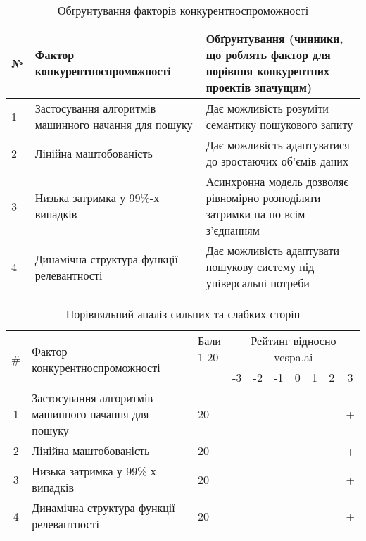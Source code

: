 \begin{table}
	\begin{tabular}
		{|l|p{7cm}|p{7cm}|} \hline
		№ & Фактор конкурентноспроможності & Обґрунтування (чинники, що роблять фактор для порівння конкурентних проектів значущим) \\ \hline
		1 & Застосування алгоритмів машинного начання для пошуку & Дає можливість розуміти семантику пошукового запиту \\ \hline
		2 & Лінійна маштобованість & Дає можливість адаптуватися до зростаючих об'ємів даних \\ \hline
		3 & Низька затримка у 99\%-х випадків  & Асинхронна модель дозволяє рівномірно розподіляти затримки на по всім з'єднанням \\ \hline
		4 & Динамічна структура функції релевантності & Дає можливість адаптувати пошукову систему під універсальні потреби \\ \hline
	\end{tabular}
	\caption{Обґрунтування факторів конкурентноспроможності}
\end{table}
\begin{table}[]
	\centering
	\begin{tabular}{|c|p{8cm}|p{1cm}|c|c|c|c|c|c|c|}
		\hline
		\multirow{2}{*}{\#} & \multirow{2}{*}{Фактор конкурентноспроможності}                 & \multirowcell{2}{Бали\\ 1-20} & \multicolumn{7}{c|}{Рейтинг відносно vespa.ai} \\ \cline{4-10}
		
		&                                                                 &                            &  -3 & -2  & -1  & 0 & 1 & 2 & 3 \\ \hline
		1                   & Застосування алгоритмів машинного начання для пошуку            & 20                         &     &     &     &   &   &   & + \\ \hline
		2                   & Лінійна маштобованість                                          & 20                         &     &     &     &   &   &   & + \\ \hline
		3                   & Низька затримка у 99\%-х випадків                               & 20                         &     &     &     &   &   &   & + \\ \hline
		4                   & Динамічна структура функції релевантності                       & 20                         &     &     &     &   &   &   & + \\ \hline
	\end{tabular}
	\caption{Порівняльний аналіз сильних та слабких сторін}
\end{table}
